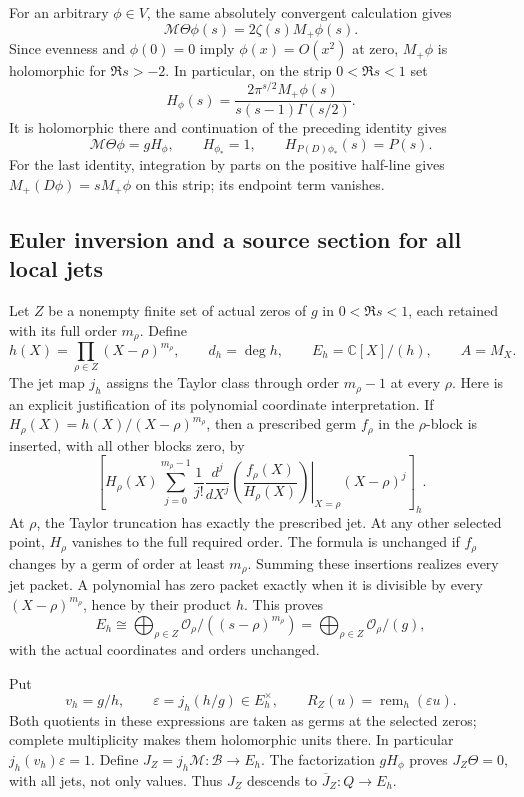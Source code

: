 For an arbitrary \(\phi\in V\), the same absolutely
convergent calculation gives
\[
\mathcal M\Theta\phi(s)=2\zeta(s)M_+\phi(s).
\]
Since evenness and \(\phi(0)=0\) imply
\(\phi(x)=O(x^2)\) at zero, \(M_+\phi\) is
holomorphic for \(\Re s>-2\). In particular, on
the strip \(0<\Re s<1\) set
\[
H_\phi(s)=
\frac{2\pi^{s/2}M_+\phi(s)}
{s(s-1)\Gamma(s/2)}.
\]
It is holomorphic there and continuation of the
preceding identity gives
\[
\mathcal M\Theta\phi=gH_\phi,\qquad
H_{\phi_*}=1,\qquad H_{P(D)\phi_*}(s)=P(s).
\]
For the last identity, integration by parts on the
positive half-line gives \(M_+(D\phi)=sM_+\phi\)
on this strip; its endpoint term vanishes.

\subsection{Euler inversion and a source section for all local jets}
\label{app:euler-source-section}

Let \(Z\) be a nonempty finite set of actual zeros of
\(g\) in \(0<\Re s<1\), each retained with its full
order \(m_\rho\). Define
\[
h(X)=\prod_{\rho\in Z}(X-\rho)^{m_\rho},
\qquad d_h=\deg h,\qquad E_h=\mathbb C[X]/(h),
\qquad A=M_X.
\]
The jet map \(j_h\) assigns the Taylor class through
order \(m_\rho-1\) at every \(\rho\).
Here is an explicit justification of its polynomial
coordinate interpretation. If
\(H_\rho(X)=h(X)/(X-\rho)^{m_\rho}\), then a
prescribed germ \(f_\rho\) in the \(\rho\)-block
is inserted, with all other blocks zero, by
\[
\left[
H_\rho(X)\sum_{j=0}^{m_\rho-1}\frac1{j!}
\left.\frac{d^j}{dX^j}
\left(\frac{f_\rho(X)}{H_\rho(X)}\right)\right|_{X=\rho}
(X-\rho)^j
\right]_h.
\]
At \(\rho\), the Taylor truncation has exactly the
prescribed jet. At any other selected point,
\(H_\rho\) vanishes to the full required order.
The formula is unchanged if \(f_\rho\) changes by
a germ of order at least \(m_\rho\).
Summing these insertions realizes every jet packet.
A polynomial has zero packet exactly when it is
divisible by every \((X-\rho)^{m_\rho}\), hence by
their product \(h\). This proves
\[
E_h\cong\bigoplus_{\rho\in Z}
\mathcal O_\rho/((s-\rho)^{m_\rho})
=\bigoplus_{\rho\in Z}\mathcal O_\rho/(g),
\]
with the actual coordinates and orders unchanged.

Put
\[
v_h=g/h,\qquad
\varepsilon=j_h(h/g)\in E_h^\times,\qquad
R_Z(u)=\operatorname{rem}_h(\varepsilon u).
\]
Both quotients in these expressions are taken as
germs at the selected zeros; complete multiplicity
makes them holomorphic units there.
In particular \(j_h(v_h)\varepsilon=1\).
Define \(J_Z=j_h\mathcal M:\mathscr B\to E_h\).
The factorization \(gH_\phi\) proves
\(J_Z\Theta=0\), with all jets, not only values.
Thus \(J_Z\) descends to \(\overline J_Z:Q\to E_h\).


